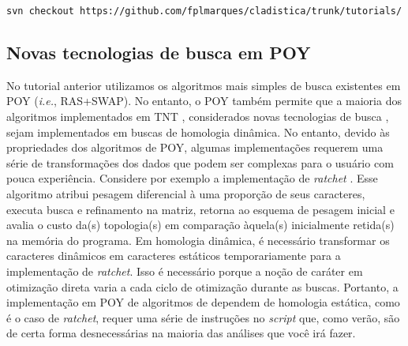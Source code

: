 \begin{center}
\small \texttt{svn checkout https://github.com/fplmarques/cladistica/trunk/tutorials/}\\
\end{center}


\newpage
\pagestyle{fancy} %
\begin{refsection}
\renewcommand*{\finalnamedelim}{\addspace\&\space} %
%
\newcommand{\A}{\textcolor{green}{\textbf{A}}}
\newcommand{\C}{\textcolor{blue}{\textbf{C}}}
\newcommand{\G}{\textcolor{gray}{\textbf{G}}}
\newcommand{\T}{\textcolor{red}{\textbf{T}}}
\newcommand{\gap}{\textcolor{black}{\textbf{-}}}


\section{Novas tecnologias de busca em POY}\label{tut10:search}

No tutorial anterior utilizamos os algoritmos mais simples de busca existentes em POY (\textit{i.e.}, RAS+SWAP). No entanto, o POY também permite que a maioria dos algoritmos implementados em TNT \parencite{GoloboffEtAl_2008}, considerados novas tecnologias de busca \parencite{Goloboff_1999,Nixon_1999}, sejam implementados em buscas de homologia dinâmica. No entanto, devido às propriedades dos algoritmos de POY, algumas implementações requerem uma série de transformações dos dados que podem ser complexas para o usuário com pouca experiência. Considere por exemplo a implementação de \textit{ratchet} \parencite{Nixon_1999}. Esse algoritmo atribui pesagem diferencial à uma proporção de seus caracteres, executa busca e refinamento na matriz, retorna ao esquema de pesagem inicial e avalia o custo da(s) topologia(s) em comparação àquela(s) inicialmente retida(s) na memória do programa. Em homologia dinâmica, é necessário transformar os caracteres dinâmicos em caracteres estáticos temporariamente para a implementação de \textit{ratchet}. Isso é necessário porque a noção de caráter em otimização direta varia a cada ciclo de otimização durante as buscas. Portanto, a implementação em POY de algoritmos de dependem de homologia estática, como é o caso de \textit{ratchet}, requer uma série de instruções no \textit{script} que, como verão, são de certa forma desnecessárias na maioria das análises que você irá fazer.


\end{refsection}

